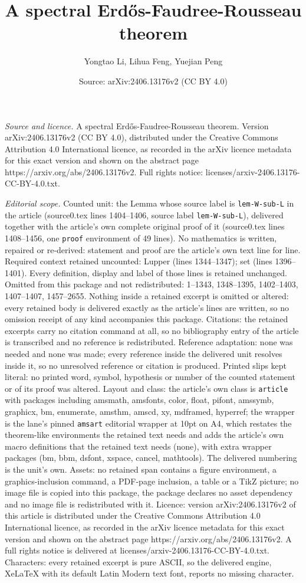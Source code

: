 \documentclass[10pt,a4paper]{amsart}
\title[A spectral Erd\H{o}s-Faudree-Rousseau theorem]{A spectral Erd\H{o}s-Faudree-Rousseau theorem}
\author{Yongtao Li, Lihua Feng, Yuejian Peng}
\date{Source: arXiv:2406.13176v2 (CC BY 4.0)}
\begin{document}
\maketitle

\noindent\emph{Source and licence.} A spectral Erd\H{o}s-Faudree-Rousseau theorem. Version arXiv:2406.13176v2 (CC BY 4.0), distributed under the Creative Commons Attribution 4.0 International licence, as recorded in the arXiv licence metadata for this exact version and shown on the abstract page https://arxiv.org/abs/2406.13176v2. Full rights notice: licenses/arxiv-2406.13176-CC-BY-4.0.txt.\par\smallskip

\noindent\textit{Editorial scope.} Counted unit: the Lemma whose source label is \texttt{lem-W-sub-L} in the article (source0.tex lines 1404--1406, source label \texttt{lem-W-sub-L}), delivered together with the article's own complete original proof of it (source0.tex lines 1408--1456, one \texttt{proof} environment of 49 lines). No mathematics is written, repaired or re-derived: statement and proof are the article's own text line for line. Required context retained uncounted: Lupper (lines 1344--1347); set (lines 1396--1401). Every definition, display and label of those lines is retained unchanged. Omitted from this package and not redistributed: 1--1343, 1348--1395, 1402--1403, 1407--1407, 1457--2655. Nothing inside a retained excerpt is omitted or altered: every retained body is delivered exactly as the article's lines are written, so no omission receipt of any kind accompanies this package. Citations: the retained excerpts carry no citation command at all, so no bibliography entry of the article is transcribed and no reference is redistributed. Reference adaptation: none was needed and none was made; every reference inside the delivered unit resolves inside it, so no unresolved reference or citation is produced. Printed slips kept literal: no printed word, symbol, hypothesis or number of the counted statement or of its proof was altered. Layout and class: the article's own class is \texttt{article} with packages including amsmath, amsfonts, color, float, pifont, amssymb, graphicx, bm, enumerate, amsthm, amscd, xy, mdframed, hyperref; the wrapper is the lane's pinned \texttt{amsart} editorial wrapper at 10pt on A4, which restates the theorem-like environments the retained text needs and adds the article's own macro definitions that the retained text needs (none), with extra wrapper packages (bm, bbm, dsfont, xspace, cancel, mathtools). The delivered numbering is the unit's own. Assets: no retained span contains a figure environment, a graphics-inclusion command, a PDF-page inclusion, a table or a TikZ picture; no image file is copied into this package, the package declares no asset dependency and no image file is redistributed with it. Licence: version arXiv:2406.13176v2 of this article is distributed under the Creative Commons Attribution 4.0 International licence, as recorded in the arXiv licence metadata for this exact version and shown on the abstract page https://arxiv.org/abs/2406.13176v2. A full rights notice is delivered at licenses/arxiv-2406.13176-CC-BY-4.0.txt. Characters: every retained excerpt is pure ASCII, so the delivered engine, XeLaTeX with its default Latin Modern text font, reports no missing character.
\end{document}
